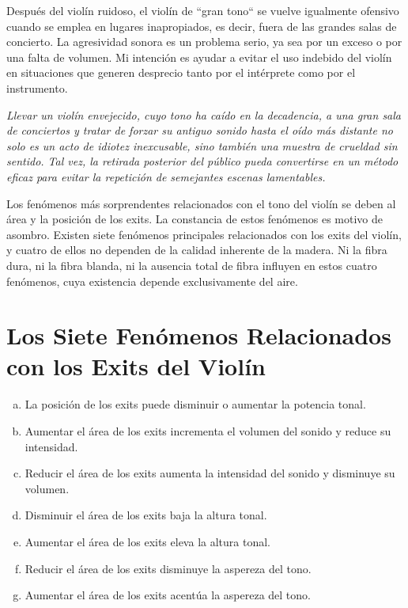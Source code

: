 \documentclass[12pt]{book}
\begin{document}
Después del violín ruidoso, el violín de ``gran tono`` se vuelve igualmente ofensivo cuando se emplea en lugares inapropiados, es decir, fuera de las grandes salas de concierto. La agresividad sonora es un problema serio, ya sea por un exceso o por una falta de volumen. Mi intención es ayudar a evitar el uso indebido del violín en situaciones que generen desprecio tanto por el intérprete como por el instrumento.  

\textit{Llevar un violín envejecido, cuyo tono ha caído en la decadencia, a una gran sala de conciertos y tratar de forzar su antiguo sonido hasta el oído más distante no solo es un acto de idiotez inexcusable, sino también una muestra de crueldad sin sentido. Tal vez, la retirada posterior del público pueda convertirse en un método eficaz para evitar la repetición de semejantes escenas lamentables.}  

Los fenómenos más sorprendentes relacionados con el tono del violín se deben al área y la posición de los exits. La constancia de estos fenómenos es motivo de asombro. Existen siete fenómenos principales relacionados con los exits del violín, y cuatro de ellos no dependen de la calidad inherente de la madera. Ni la fibra dura, ni la fibra blanda, ni la ausencia total de fibra influyen en estos cuatro fenómenos, cuya existencia depende exclusivamente del aire.

\section*{Los Siete Fenómenos Relacionados con los Exits del Violín}

\begin{enumerate}[(a)]
    \item La posición de los exits puede disminuir o aumentar la potencia tonal.
    \item Aumentar el área de los exits incrementa el volumen del sonido y reduce su intensidad.
    \item Reducir el área de los exits aumenta la intensidad del sonido y disminuye su volumen.
    \item Disminuir el área de los exits baja la altura tonal.
    \item Aumentar el área de los exits eleva la altura tonal.
    \item Reducir el área de los exits disminuye la aspereza del tono.
    \item Aumentar el área de los exits acentúa la aspereza del tono.
\end{enumerate}
\end{document}
